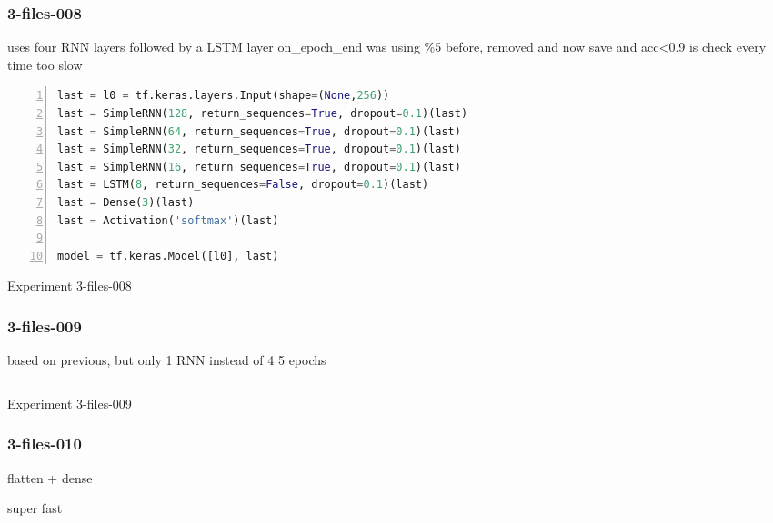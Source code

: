 \subsubsection{3-files-008}
uses four RNN layers followed by a LSTM layer
on\_epoch\_end was using \%5 before, removed and now save and acc<0.9 is check every time
too slow

\noindent
\begin{algorithm}
\begin{lstlisting}[language=Python, frame=single, numbers=left]
last = l0 = tf.keras.layers.Input(shape=(None,256))
last = SimpleRNN(128, return_sequences=True, dropout=0.1)(last)
last = SimpleRNN(64, return_sequences=True, dropout=0.1)(last)
last = SimpleRNN(32, return_sequences=True, dropout=0.1)(last)
last = SimpleRNN(16, return_sequences=True, dropout=0.1)(last)
last = LSTM(8, return_sequences=False, dropout=0.1)(last)
last = Dense(3)(last)
last = Activation('softmax')(last)

model = tf.keras.Model([l0], last)
\end{lstlisting}
\caption{\label{alg:3-files-008}Experiment 3-files-008}
\end{algorithm}

\subsubsection{3-files-009}

based on previous, but only 1 RNN instead of 4
5 epochs

\noindent
\begin{algorithm}
\begin{lstlisting}[language=Python, frame=single, numbers=left]
\end{lstlisting}
\caption{\label{alg:3-files-009}Experiment 3-files-009}
\end{algorithm}

\subsubsection{3-files-010}

flatten + dense


super fast

